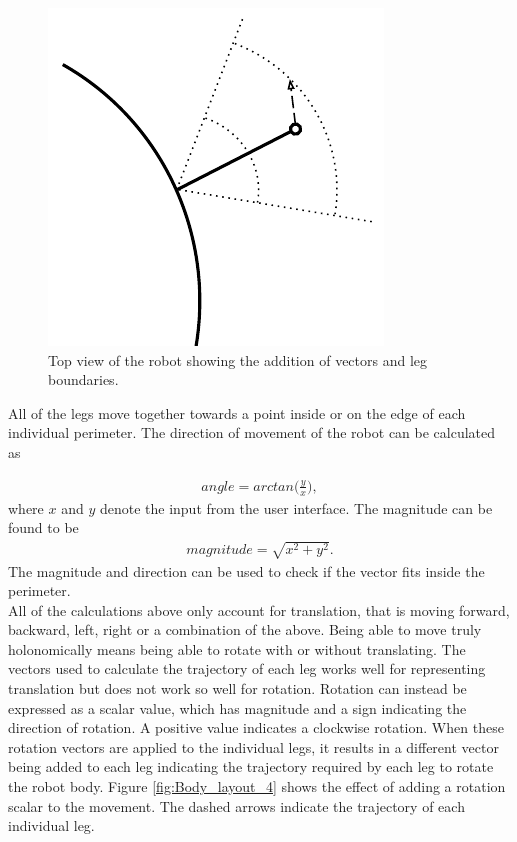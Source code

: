 \FloatBarrier
\begin{figure}[h]
\centering
\includegraphics[scale = 1]{pics/Body_Layout_3.pdf}
\caption{Top view of the robot showing the addition of vectors and leg boundaries.}
\label{fig:Body_layout_3}
\end{figure}
\FloatBarrier

All of the legs move together towards a point inside or on the edge of each individual perimeter. The direction of movement of the robot can be calculated as

\begin{align}
angle = arctan \Bigg(\frac{y}{x}\Bigg),
\end{align}
where $x$ and $y$ denote the input from the user interface. The magnitude can be found to be
\begin{align}
magnitude = \sqrt{x^2+y^2}.
\end{align}
The magnitude and direction can be used to check if the vector fits inside the perimeter.\\

All of the calculations above only account for translation, that is moving forward, backward, left, right or a combination of the above. Being able to move truly holonomically means being able to rotate with or without translating. The vectors used to calculate the trajectory of each leg works well for representing translation but does not work so well for rotation. Rotation can instead be expressed as a scalar value, which has magnitude and a sign indicating the direction of rotation. A positive value indicates a clockwise rotation. When these rotation vectors are applied to the individual legs, it results in a different vector being added to each leg indicating the trajectory required by each leg to rotate the robot body. Figure \ref{fig:Body_layout_4} shows the effect of adding a rotation scalar to the movement. The dashed arrows indicate the trajectory of each individual leg.

